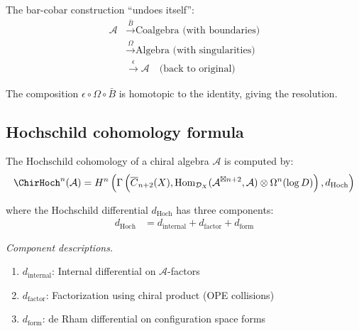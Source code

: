 \begin{remark}
The bar-cobar construction ``undoes itself'':
\begin{align*}
\mathcal{A} &\xrightarrow{\bar{B}} \text{Coalgebra (with boundaries)}\\
&\xrightarrow{\Omega} \text{Algebra (with singularities)}\\
&\xrightarrow{\epsilon} \mathcal{A} \quad \text{(back to original)}
\end{align*}

The composition $\epsilon \circ \Omega \circ \bar{B}$ is homotopic to the identity, giving
the resolution.
\end{remark}

\subsection{Hochschild cohomology formula}

\begin{theorem}\label{thm:HH-config-space-formula}
The Hochschild cohomology of a chiral algebra $\mathcal{A}$ is computed by:
\[\ChirHoch^n(\mathcal{A}) = H^n\left(\Gamma\left(\overline{C}_{n+2}(X), 
\text{Hom}_{\mathcal{D}_X}(\mathcal{A}^{\boxtimes n+2}, \mathcal{A}) \otimes \Omega^n(\log D)\right), d_{\text{Hoch}}\right)\]

where the Hochschild differential $d_{\text{Hoch}}$ has three components:
\begin{align}
d_{\text{Hoch}} &= d_{\text{internal}} + d_{\text{factor}} + d_{\text{form}} \label{eq:d-Hoch-decomposition}
\end{align}

\emph{Component descriptions.}
\begin{enumerate}
\item $d_{\text{internal}}$: Internal differential on $\mathcal{A}$-factors
\item $d_{\text{factor}}$: Factorization using chiral product (OPE collisions)
\item $d_{\text{form}}$: de Rham differential on configuration space forms
\end{enumerate}
\end{theorem}


